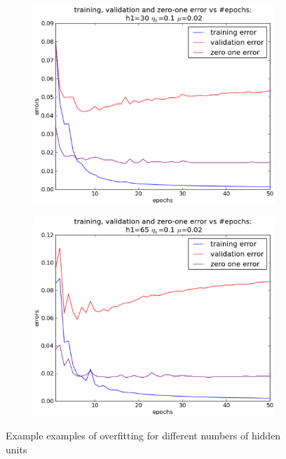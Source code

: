 \begin{figure}[!ht]
\begin{subfigure}[b]{.45\textwidth}
	\caption{}
	\label{subfig:overfit2}
	\end{subfigure}
	\quad	
	\begin{subfigure}[b]{.45\textwidth}
	\centering
	\includegraphics[width=\textwidth]{mlp/plots/test/30h1_overfitting_50_epochs.eps}
	\caption{}
	\label{subfig:overfit3}
	\end{subfigure}
	\quad
	\begin{subfigure}[b]{.45\textwidth}
	\centering
	\includegraphics[width=\textwidth]{mlp/plots/test/65h1_overfitting_50_epochs.eps}
	\caption{}
	\label{subfig:overfit4}
	\end{subfigure}
	\caption{Example examples of overfitting for different numbers of hidden units}
	\label{fig:overfitting}
	\end{figure}
